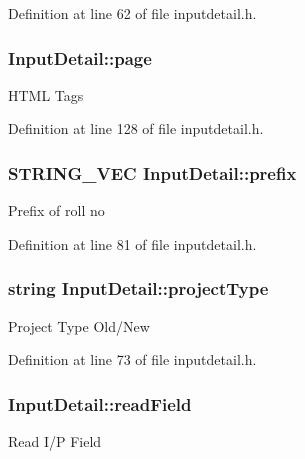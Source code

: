 Definition at line 62 of file inputdetail.\-h.

\hypertarget{classInputDetail_ae487757aaafba4ac372c327e2b7a9673}{
\subsubsection[{page}]{ Input\-Detail\-::page}}\label{classInputDetail_ae487757aaafba4ac372c327e2b7a9673}
H\-T\-M\-L Tags 

Definition at line 128 of file inputdetail.\-h.

\hypertarget{classInputDetail_af81c2cdf9b1336634bbb33165921d879}{
\subsubsection[{prefix}]{\setlength{\rightskip}{0pt plus 5cm}S\-T\-R\-I\-N\-G\-\_\-\-V\-E\-C Input\-Detail\-::prefix\hspace{0.3cm}{\ttfamily [protected]}}}\label{classInputDetail_af81c2cdf9b1336634bbb33165921d879}
Prefix of roll no 

Definition at line 81 of file inputdetail.\-h.

\hypertarget{classInputDetail_ad2c46fdc8093eb88e01497e55b2e8e4d}{
\subsubsection[{project\-Type}]{\setlength{\rightskip}{0pt plus 5cm}string Input\-Detail\-::project\-Type\hspace{0.3cm}{\ttfamily [protected]}}}\label{classInputDetail_ad2c46fdc8093eb88e01497e55b2e8e4d}
Project Type Old/\-New 

Definition at line 73 of file inputdetail.\-h.

\hypertarget{classInputDetail_ac0cc70b017ef94fb55acb46fc44f0df5}{
\subsubsection[{read\-Field}]{ Input\-Detail\-::read\-Field}}\label{classInputDetail_ac0cc70b017ef94fb55acb46fc44f0df5}
Read I/\-P Field 

